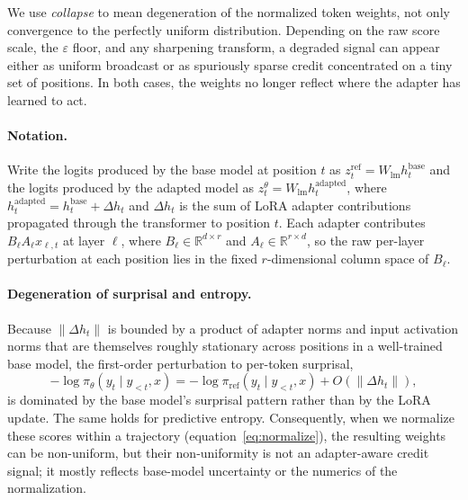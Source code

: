 We use \emph{collapse} to mean degeneration of the normalized token weights,
not only convergence to the perfectly uniform distribution. Depending on the
raw score scale, the $\varepsilon$ floor, and any sharpening transform, a
degraded signal can appear either as uniform broadcast or as spuriously sparse
credit concentrated on a tiny set of positions. In both cases, the weights no
longer reflect where the adapter has learned to act.

\paragraph{Notation.}
Write the logits produced by the base model at position $t$ as
$z_t^{\mathrm{ref}} = W_{\mathrm{lm}} h_t^{\mathrm{base}}$ and the logits
produced by the adapted model as $z_t^{\theta} = W_{\mathrm{lm}}
h_t^{\mathrm{adapted}}$, where $h_t^{\mathrm{adapted}} = h_t^{\mathrm{base}} +
\Delta h_t$ and $\Delta h_t$ is the sum of LoRA adapter contributions
propagated through the transformer to position $t$. Each adapter contributes
$B_\ell A_\ell x_{\ell,t}$ at layer $\ell$, where $B_\ell \in \mathbb{R}^{d
\times r}$ and $A_\ell \in \mathbb{R}^{r \times d}$, so the raw per-layer
perturbation at each position lies in the fixed $r$-dimensional column space
of $B_\ell$.

\paragraph{Degeneration of surprisal and entropy.}
Because $\|\Delta h_t\|$ is bounded by a product of adapter norms and input
activation norms that are themselves roughly stationary across positions in a
well-trained base model, the first-order perturbation to per-token surprisal,
\[
-\log \pi_\theta(y_t \mid y_{<t}, x) =
-\log \pi_{\mathrm{ref}}(y_t \mid y_{<t}, x) + O(\|\Delta h_t\|),
\]
is dominated by the base model's surprisal pattern rather than by the LoRA
update. The same holds for predictive entropy. Consequently, when we
normalize these scores within a trajectory (equation~\eqref{eq:normalize}),
the resulting weights can be non-uniform, but their non-uniformity is not an
adapter-aware credit signal; it mostly reflects base-model uncertainty or the
numerics of the normalization.

